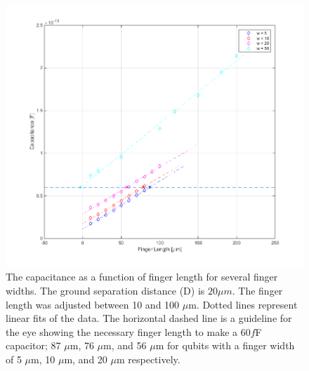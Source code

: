 \begin{figure}
	\centering
	\includegraphics[width = \textwidth]{Figures/Capacitances_g5_50}
	\caption{The capacitance as a function of finger length for several finger widths. The ground separation distance (D) is \(20\mu m\). The finger length was adjusted between 10 and 100 \(\mu\)m. Dotted lines represent linear fits of the data. The horizontal dashed line is a guideline for the eye showing the necessary finger length to make a 60\(f\)F capacitor; 87 \(\mu\)m, 76 \(\mu\)m, and 56 \(\mu\)m for qubits with a finger width of  5 \(\mu\)m, 10 \(\mu\)m, and 20 \(\mu\)m respectively.}
	\label{fig:Capacitances_g5_50}
\end{figure} 

\clearpage

